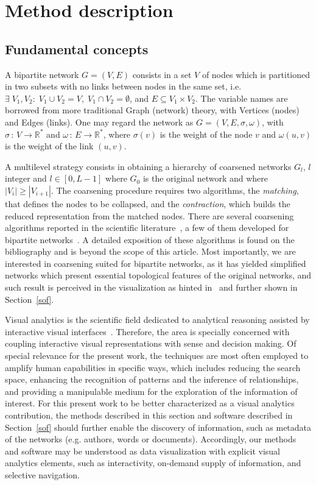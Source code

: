 \documentclass[runningheads]{llncs}
\begin{document}
\section{Method description}\label{des}
\subsection{Fundamental concepts}\label{bac}
A bipartite network $G=(V,E)$ consists in a set $V$ of nodes which is partitioned in two subsets
with no links between nodes in the same set, i.e. $\exists\; V_1, V_2:\; V_1\cup V_2 = V,\;V_1\cap V_2 = \emptyset$, and $E\subseteq V_1 \times V_2$.
The variable names are borrowed from more traditional
Graph (network) theory, with Vertices (nodes) and Edges (links).
One may regard the network as $G=(V,E,\sigma,\omega)$, with
$\sigma\,:\,V\rightarrow \mathbb{R}^*$ and $\omega\,:\,E \rightarrow \mathbb{R}^*$,
where $\sigma(v)$ is the weight of the node $v$ and
$\omega(u,v)$ is the weight of the link $(u,v)$.

A multilevel strategy consists in obtaining a hierarchy of coarsened networks $G_l$, $l$ integer and $l \in [0,L-1]$ where $G_0$ is the original network
and where $|V_i| \geq |V_{i+1}|$.
The coarsening procedure requires two algorithms, the \emph{matching}, that defines the nodes to be collapsed, and the \emph{contraction}, which builds the reduced representation
from the matched nodes.
There are several coarsening algorithms reported in the scientific literature~\cite{co1,co2}, a few of them
developed for bipartite networks~\cite{alan2}.
A detailed exposition of these algorithms is found on the bibliography and is beyond the scope of this article.
Most importantly, we are interested in coarsening suited for bipartite networks,
as it has yielded simplified networks which present essential topological features
of the original networks,
and such result is perceived in the visualization as hinted in~\cite{alan2} and further shown in
Section~\ref{sof}.

Visual analytics is the scientific field dedicated to analytical reasoning assisted by interactive visual interfaces~\cite{visAn}.
Therefore, the area is specially concerned with coupling interactive visual representations with sense and decision making.
Of special relevance for the present work, the techniques are most often employed to amplify human capabilities in specific ways,
which includes reducing the search space, enhancing the recognition of patterns and the inference of relationships,
and providing a manipulable medium for the exploration of the information of interest.
For this present work to be better characterized as a visual analytics contribution, the methods described in this section and software described in Section~\ref{sof} should further enable the discovery of information, such as metadata of the networks (e.g. authors, words or documents).
Accordingly, our methods and software may be understood as data visualization with explicit visual analytics elements, such as interactivity, on-demand supply of information, and selective navigation.
\end{document}
